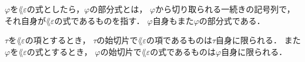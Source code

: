 	$\varphi$を$\lang{\varepsilon}$の式としたら，$\varphi$の部分式とは，
	$\varphi$から切り取られる一続きの記号列で，それ自身が$\lang{\varepsilon}$の式であるものを指す．
	$\varphi$自身もまた$\varphi$の部分式である．
	
	\begin{screen}
		\begin{metathm}
		\label{metathm:initial_segment_L_epsilon}
			$\tau$を$\lang{\varepsilon}$の項とするとき，
			$\tau$の始切片で$\lang{\varepsilon}$の項であるものは$\tau$自身に限られる．
			また$\varphi$を$\lang{\varepsilon}$の式とするとき，
			$\varphi$の始切片で$\lang{\varepsilon}$の式であるものは$\varphi$自身に限られる．
		\end{metathm}
	\end{screen}
	
